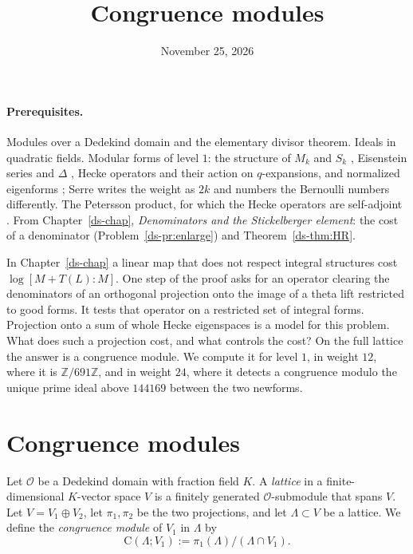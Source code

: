 \documentclass[reqno]{amsart}
\title{Congruence modules}
\author{}
\date{November 25, 2026}
\newcounter{chap}
\theoremstyle{definition}
\theoremstyle{plain}
\newcommand{\Z}{\mathbb{Z}}
\newcommand{\Oc}{\mathcal{O}}
\newcommand{\Cg}{\mathrm{C}}
\begin{document}
\maketitle
{}\label{chap}

\paragraph{Prerequisites.}
Modules over a Dedekind domain and the elementary divisor theorem.  Ideals in quadratic fields.  Modular forms of level \(1\): the structure of \(M_k\) and \(S_k\) \cite[Ch.~VII, \S3.2, Thm.~4]{SeA}, Eisenstein series and \(\Delta\) \cite[Ch.~VII, \S\S4.2--4.3]{SeA}, Hecke operators and their action on \(q\)-expansions, and normalized eigenforms \cite[Ch.~VII, \S\S5.3--5.5]{SeA}; Serre writes the weight as \(2k\) and numbers the Bernoulli numbers differently.  The Petersson product, for which the Hecke operators are self-adjoint \cite[\S5.5]{DS}.  From Chapter~\ref{ds-chap}, \emph{Denominators and the Stickelberger element}: the cost of a denominator (Problem~\ref{ds-pr:enlarge}) and Theorem~\ref{ds-thm:HR}.

In Chapter~\ref{ds-chap} a linear map that does not respect integral structures cost \(\log [M + T(L) : M]\).  One step of the proof asks for an operator clearing the denominators of an orthogonal projection onto the image of a theta lift restricted to good forms.  It tests that operator on a restricted set of integral forms.  Projection onto a sum of whole Hecke eigenspaces is a model for this problem.  What does such a projection cost, and what controls the cost?  On the full lattice the answer is a congruence module.  We compute it for level \(1\), in weight \(12\), where it is \(\Z/691\Z\), and in weight \(24\), where it detects a congruence modulo the unique prime ideal above \(144169\) between the two newforms.

\section{Congruence modules}\label{sec:modules}

Let \(\Oc\) be a Dedekind domain with fraction field \(K\).  A \emph{lattice} in a finite-dimensional \(K\)-vector space \(V\) is a finitely generated \(\Oc\)-submodule that spans \(V\).  Let \(V = V_1 \oplus V_2\), let \(\pi_1, \pi_2\) be the two projections, and let \(\Lambda \subset V\) be a lattice.  We define the \emph{congruence module} of \(V_1\) in \(\Lambda\) by
\[
  \Cg(\Lambda; V_1) := \pi_1(\Lambda) / (\Lambda \cap V_1) .
\]
\end{document}
